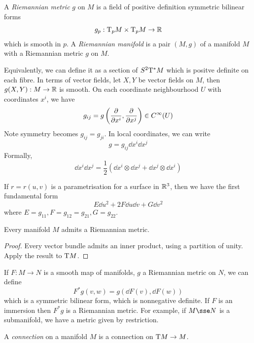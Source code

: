 \documentclass{article}
\begin{document}
\begin{definition}
    A \emph{Riemannian metric} \(g\) on \(M\) is a field of positive definition symmetric bilinear forms
    \[g_p : \mathrm{T}_pM \times \mathrm{T}_pM \to \mathbb{R}\]
    which is smooth in \(p\). A \emph{Riemannian manifold} is a pair \((M, g)\) of a manifold \(M\) with a Riemannian metric \(g\) on \(M\).
\end{definition}
Equivalently, we can define it as a section of \(S^2\mathrm{T}^*M\) which is positve definite on each fibre. In terms of vector fields, let \(X, Y\) be vector fields on \(M\), then \(g(X, Y) : M \to \mathbb{R}\) is smooth. On each coordinate neighbourhood \(U\) with coordinates \(x^i\), we have
\[g_{ij} = g\left(\pdv{x^i}, \pdv{x^j}\right) \in C^\infty(U)\]
Note symmetry becomes \(g_{ij} = g_{ji}\). In local coordinates, we can write
\[g = g_{ij}\dd x^i \dd x^j\]
Formally, 
\[\dd x^i \dd x^j = \frac{1}{2}\left(\dd x^i \otimes \dd x^j + \dd x^j \otimes \dd x^i\right)\]
\begin{example}
    If \(r = r(u, v)\) is a parametrisation for a surface in \(\mathbb{R}^3\), then we have the first fundamental form
    \[E \dd u^2 + 2F\dd u \dd v + G \dd v^2\]
    where \(E = g_{11}, F = g_{12} = g_{21}, G = g_{22}\).
\end{example}

\begin{theorem}
    Every manifold \(M\) admits a Riemannian metric.
\end{theorem}
\begin{proof}
    Every vector bundle admits an inner product, using a partition of unity. Apply the result to \(\mathrm{T} M\).
\end{proof}

If \(F : M \to N\) is a smooth map of manifolds, \(g\) a Riemannian metric on \(N\), we can define
\[F^*g(v, w) = g(\dd F(v), \dd F(w))\]
which is a symmetric bilinear form, which is nonnegative definite. If \(F\) is an immersion then \(F^*g\) is a Riemannian metric. For example, if \(M \sse N\) is a submanifold, we have a metric given by restriction.

\begin{definition}
    [connection] A \emph{connection} on a manifold \(M\) is a connection on \(\mathrm{T} M \to M\).
\end{definition}
\end{document}
